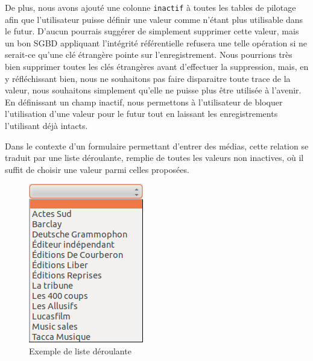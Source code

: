 \documentclass[letter, 11pt]{report}
\begin{document}
De plus, nous avons ajouté une colonne \texttt{inactif} à toutes les tables de pilotage afin que l'utilisateur puisse définir une valeur comme n'étant plus utilisable dans le futur. D'aucun pourrais suggérer de simplement supprimer cette valeur, mais un bon \ac{SGBD} appliquant l'intégrité référentielle refusera une telle opération si ne serait-ce qu'une clé étrangère pointe sur l'enregistrement. Nous pourrions très bien supprimer toutes les clés étrangères avant d'effectuer la suppression, mais, en y réfléchissant bien, nous ne souhaitons pas faire disparaitre toute trace de la valeur, nous souhaitons simplement qu'elle ne puisse plus être utilisée à l'avenir. En définissant un champ inactif, nous permettons à l'utilisateur de bloquer l'utilisation d'une valeur pour le futur tout en laissant les enregistrements l'utilisant déjà intacts.

Dans le contexte d'un formulaire permettant d'entrer des médias, cette relation se traduit par une liste déroulante, remplie de toutes les valeurs non inactives, où il suffit de choisir une valeur parmi celles proposées.

\begin{figure}[htbp]
	\begin{center}
		\includegraphics[scale=0.5]{exempleListeDeroulante.png}
	\end{center}
	\caption{Exemple de liste déroulante}
\end{figure}
\end{document}
